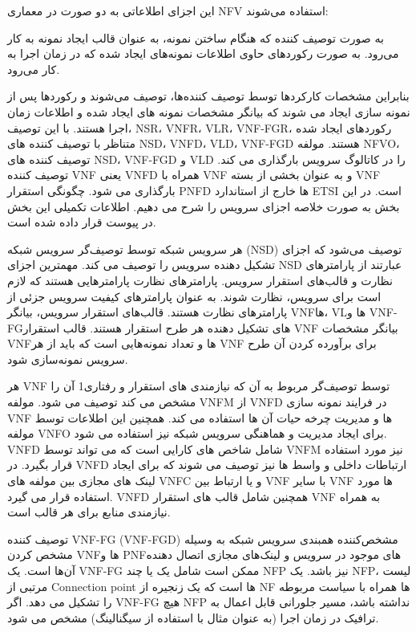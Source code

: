 این اجزای اطلاعاتی به دو صورت در معماری NFV استفاده می‌شوند:

 به صورت توصیف کننده که هنگام ساختن نمونه، به عنوان قالب ایجاد نمونه به کار می‌رود.
 به صورت رکوردهای حاوی اطلاعات نمونه‌های ایجاد شده که در زمان اجرا به کار می‌رود.

بنابراین مشخصات کارکردها توسط توصیف کننده‌ها، توصیف می‌شوند و رکوردها پس از نمونه سازی ایجاد می شوند که بیانگر مشخصات نمونه های ایجاد شده و اطلاعات زمان اجرا هستند.
با این توصیف، NSR، VNFR، VLR، VNF-FGR، رکوردهای ایجاد شده متناظر با توصیف کننده های NSD، VNFD، VLD، VNF-FGD هستند. مولفه NFVO، توصیف کننده های NSD، VNF-FGD و VLD را در کاتالوگ سرویس بارگذاری می کند. توصیف کننده VNF یعنی VNFD همراه با VNF و به عنوان بخشی از بسته VNF بارگذاری می شود. چگونگی استقرار PNFD ها خارج از استاندارد ETSI است. در این بخش به صورت خلاصه اجزای سرویس را شرح می دهیم. اطلاعات تکمیلی این بخش در پیوست قرار داده شده است.


هر سرویس شبکه توسط توصیف‌گر سرویس شبکه (NSD) توصیف می‌شود که اجزای تشکیل دهنده سرویس را توصیف می کند. مهمترین  اجزای NSD عبارتند از
پارامترهای نظارت و قالب‌های استقرار سرویس.
پارامترهای نظارت پارامترهایی هستند که لازم است برای سرویس، نظارت شوند.
به عنوان پارامترهای کیفیت سرویس جزئی از پارامترهای نظارت هستند. قالب‌های استقرار سرویس، بیانگر VNFها، VLها و VNF-FGهای تشکیل دهنده هر طرح استقرار هستند.
قالب استقرار VNF بیانگر مشخصات VNFها و تعداد نمونه‌هایی است که باید از هر VNF برای برآورده کردن آن طرح سرویس نمونه‌سازی شود.


هر VNF توسط توصیف‌گر مربوط به آن که نیازمندی های استقرار و رفتاری1 آن را مشخص می کند توصیف می شود. مولفه VNFM از VNFD در فرایند نمونه سازی VNF ها و مدیریت چرخه حیات آن ها استفاده می کند. همچنین این اطلاعات توسط مولفه VNFO برای ایجاد مدیریت و هماهنگی سرویس شبکه نیز استفاده می شود. VNFD شامل شاخص های کارایی است که می تواند توسط VNFM نیز مورد استفاده قرار بگیرد. در VNFD ارتباطات داخلی و واسط ها نیز توصیف می شوند که برای ایجاد لینک های مجازی بین مولفه های VNFC و یا ارتباط بین VNF با سایر VNF ها مورد استفاده قرار می گیرد. VNFD همچنین شامل قالب های استقرار VNF به همراه نیازمندی منابع برای هر قالب است.


توصیف کننده
VNF-FG
(VNF-FGD)
مشخص‌کننده همبندی سرویس شبکه به وسیله مشخص کردن VNFها و PNFهای موجود در سرویس و لینک‌های مجازی اتصال دهنده آن‌ها است. یک VNF-FG ممکن است شامل یک یا چند NFP نیز باشد. یک NFP، لیست مرتبی از Connection point ها است که یک زنجیره از NF ها همراه با سیاست مربوطه را تشکیل می دهد. اگر VNF-FG هیچ NFP نداشته باشد، مسیر جلورانی قابل اعمال به ترافیک در زمان اجرا (به عنوان مثال با استفاده از سیگنالینگ) مشخص می شود.

